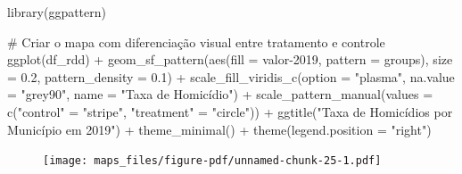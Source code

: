 \documentclass[
  letterpaper,
  DIV=11,
  numbers=noendperiod]{scrartcl}
\newenvironment{Shaded}{\begin{snugshade}}{\end{snugshade}}
\newcommand{\AttributeTok}[1]{\textcolor[rgb]{0.40,0.45,0.13}{#1}}
\newcommand{\CommentTok}[1]{\textcolor[rgb]{0.37,0.37,0.37}{#1}}
\newcommand{\FloatTok}[1]{\textcolor[rgb]{0.68,0.00,0.00}{#1}}
\newcommand{\FunctionTok}[1]{\textcolor[rgb]{0.28,0.35,0.67}{#1}}
\newcommand{\NormalTok}[1]{\textcolor[rgb]{0.00,0.23,0.31}{#1}}
\newcommand{\OtherTok}[1]{\textcolor[rgb]{0.00,0.23,0.31}{#1}}
\newcommand{\SpecialCharTok}[1]{\textcolor[rgb]{0.37,0.37,0.37}{#1}}
\newcommand{\StringTok}[1]{\textcolor[rgb]{0.13,0.47,0.30}{#1}}
\begin{document}
\begin{Shaded}
\begin{Highlighting}[]
\FunctionTok{library}\NormalTok{(ggpattern)}

\CommentTok{\# Criar o mapa com diferenciação visual entre tratamento e controle}
\FunctionTok{ggplot}\NormalTok{(df\_rdd) }\SpecialCharTok{+}
  \FunctionTok{geom\_sf\_pattern}\NormalTok{(}\FunctionTok{aes}\NormalTok{(}\AttributeTok{fill =} \StringTok{\textasciigrave{}}\AttributeTok{valor{-}2019}\StringTok{\textasciigrave{}}\NormalTok{, }\AttributeTok{pattern =}\NormalTok{ groups), }
                  \AttributeTok{size =} \FloatTok{0.2}\NormalTok{, }\AttributeTok{pattern\_density =} \FloatTok{0.1}\NormalTok{) }\SpecialCharTok{+}
  \FunctionTok{scale\_fill\_viridis\_c}\NormalTok{(}\AttributeTok{option =} \StringTok{"plasma"}\NormalTok{, }\AttributeTok{na.value =} \StringTok{"grey90"}\NormalTok{, }\AttributeTok{name =} \StringTok{"Taxa de Homicídio"}\NormalTok{) }\SpecialCharTok{+}
  \FunctionTok{scale\_pattern\_manual}\NormalTok{(}\AttributeTok{values =} \FunctionTok{c}\NormalTok{(}\StringTok{"control"} \OtherTok{=} \StringTok{"stripe"}\NormalTok{, }\StringTok{"treatment"} \OtherTok{=} \StringTok{"circle"}\NormalTok{)) }\SpecialCharTok{+}
  \FunctionTok{ggtitle}\NormalTok{(}\StringTok{"Taxa de Homicídios por Município em 2019"}\NormalTok{) }\SpecialCharTok{+}
  \FunctionTok{theme\_minimal}\NormalTok{() }\SpecialCharTok{+}
  \FunctionTok{theme}\NormalTok{(}\AttributeTok{legend.position =} \StringTok{"right"}\NormalTok{)}
\end{Highlighting}
\end{Shaded}

\begin{figure}[H]

{\centering \texttt{[image: maps\_files/figure-pdf/unnamed-chunk-25-1.pdf]}

}

\end{figure}
\end{document}
